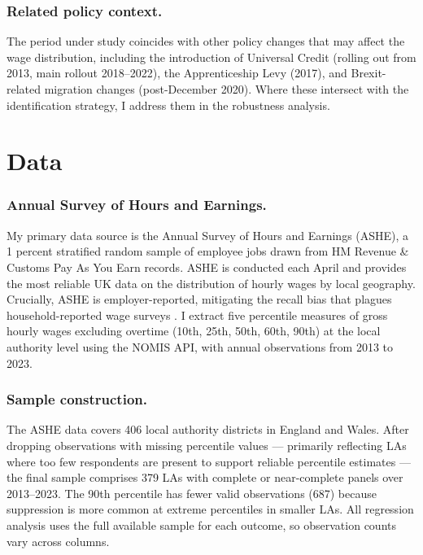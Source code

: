 \documentclass[12pt]{article}
\begin{document}
\subsubsection*{Related policy context.}
The period under study coincides with other policy changes that may affect the wage distribution, including the introduction of Universal Credit (rolling out from 2013, main rollout 2018--2022), the Apprenticeship Levy (2017), and Brexit-related migration changes (post-December 2020). Where these intersect with the identification strategy, I address them in the robustness analysis.

\section{Data}
\label{sec:data}

\subsubsection*{Annual Survey of Hours and Earnings.}
My primary data source is the Annual Survey of Hours and Earnings (ASHE), a 1 percent stratified random sample of employee jobs drawn from HM Revenue \& Customs Pay As You Earn records. ASHE is conducted each April and provides the most reliable UK data on the distribution of hourly wages by local geography. Crucially, ASHE is employer-reported, mitigating the recall bias that plagues household-reported wage surveys \citep{dickens2010minimum}. I extract five percentile measures of gross hourly wages excluding overtime (10th, 25th, 50th, 60th, 90th) at the local authority level using the NOMIS API, with annual observations from 2013 to 2023.

\subsubsection*{Sample construction.}
The ASHE data covers 406 local authority districts in England and Wales. After dropping observations with missing percentile values --- primarily reflecting LAs where too few respondents are present to support reliable percentile estimates --- the final sample comprises 379 LAs with complete or near-complete panels over 2013--2023. The 90th percentile has fewer valid observations (687) because suppression is more common at extreme percentiles in smaller LAs. All regression analysis uses the full available sample for each outcome, so observation counts vary across columns.
\end{document}

